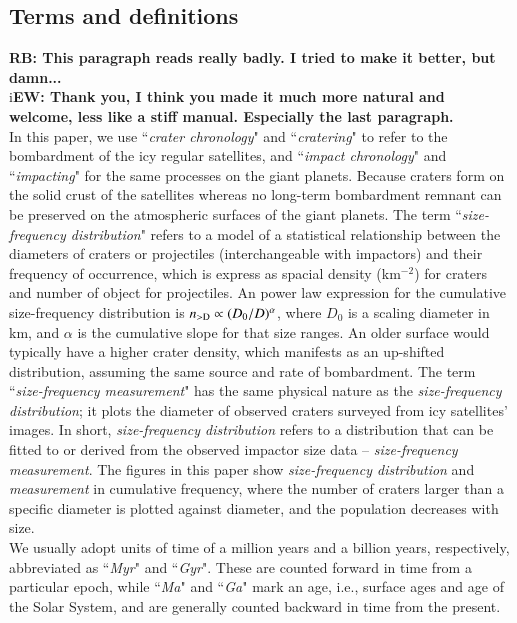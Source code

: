 \documentclass[preprint,12pt,3p,times,authoryear]{elsarticle}
\begin{document}
\subsection{Terms and definitions}
\label{term&def}
{\bf RB: This paragraph reads really badly. I tried to make it better, but damn...}\\
i{\bf EW: Thank you, I think you made it much more natural and welcome, less like a stiff manual.
Especially the last paragraph.} \\
In this paper, we use ``{\it crater chronology}" and ``{\it cratering}" to refer to the bombardment of the icy regular satellites, and ``{\it impact chronology}" and ``{\it impacting}" for the same processes on the giant planets. Because craters form on the solid crust of the satellites whereas no long-term bombardment remnant can be preserved on the atmospheric surfaces of the giant planets. The term
``{\it size-frequency distribution}" refers to a model of a statistical relationship between the diameters of craters or projectiles (interchangeable with impactors) and their frequency of occurrence, which is express as spacial density (km$^{-2}$) for craters and number of object for projectiles.
An power law expression for the cumulative size-frequency distribution is $n_{\rm >D} \propto (D_0/D)^\alpha$, %
where $D_0$ is a scaling diameter in km, and $\alpha$ is the cumulative slope for that size ranges.
An older surface would typically have a higher crater density, which manifests as an up-shifted distribution, assuming the same source and rate of bombardment. The term ``{\it size-frequency measurement}" has the same physical nature as the {\it size-frequency distribution}; it plots the diameter of observed craters surveyed from icy satellites' images. In short, {\it size-frequency distribution} refers to a distribution that can be fitted to or derived from the observed impactor size data -- {\it size-frequency measurement}. The figures in this paper show {\it size-frequency distribution} and {\it measurement} in cumulative frequency, where the number of craters larger than a specific diameter is plotted against diameter, and the population decreases with size. \\

We usually adopt units of time of a million years and a billion years, respectively, abbreviated as ``{\it Myr}" and ``{\it Gyr}". These are counted forward in time from a particular epoch, while ``{\it Ma}" and ``{\it Ga}" mark an age, i.e., surface ages and age of the Solar System, and are generally counted backward in time from the present.
\end{document}
